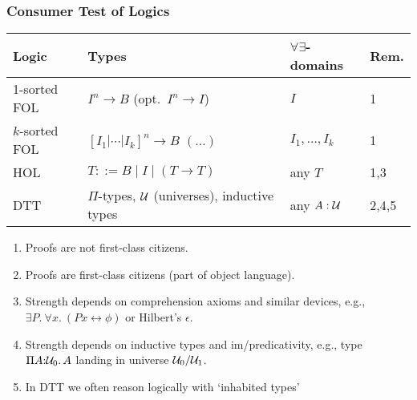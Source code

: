 \documentclass[handout]{beamer}
\newcommand{\depi}[3]{\Pi{#1{:}#2.\,#3}}
\newcommand{\UU}{{\cal U}}
\begin{document}
 
\frame
  {
  
    \frametitle{Consumer Test of Logics}

    \begin{tabular}{|l|p{}|l|l|}
\hline
Logic & Types & $\forall\exists$-domains & Rem.\\
\hline
1-sorted FOL & $I^n \to B$ (opt.\ $I^n \to I$)& $I$  & 1\\
\hline
$k$-sorted FOL& $[I_1 |\cdots| I_k]^n \to B$ $(\ldots)$  & $I_1,\ldots,I_k$ & 1\\
\hline
HOL & $T ::= B \mid I \mid (T{\to}T)$ & any $T$ & 1,3\\
\hline
DTT & $\Pi$-types, $\UU$ (universes), inductive types& any $A:\UU$   & 2,4,5\\
\hline
\end{tabular}

\begin{enumerate}
\item Proofs are not first-class citizens.
\item Proofs are first-class citizens (part of object language).
\item Strength depends on comprehension axioms and similar devices,
e.g., $\exists P.~\forall x.~ (Px \leftrightarrow \phi)$ or Hilbert's $\epsilon$.
\item Strength depends on inductive types and im/predicativity, e.g.,
type $\depi{A}{\UU_0}{A}$ landing in universe $\UU_0 / \UU_1$.
\item In DTT we often reason logically with `inhabited types' 
\end{enumerate}
 }
\end{document}
